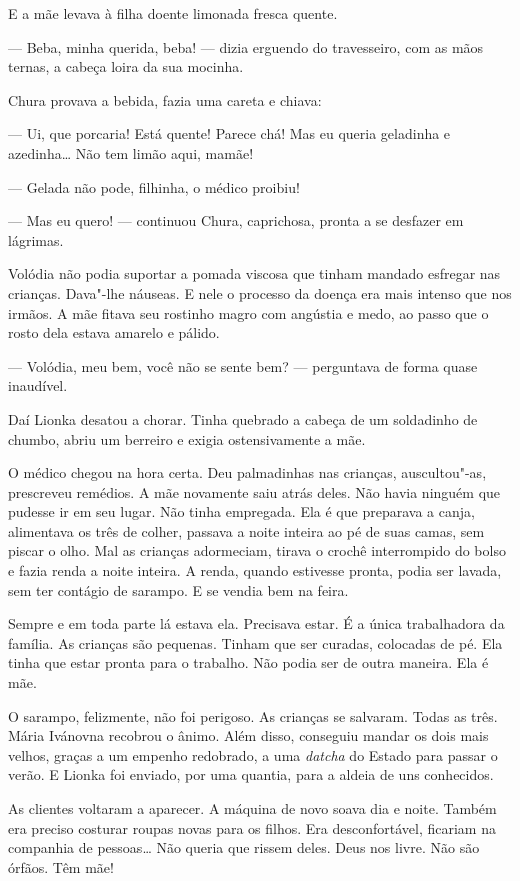 E a mãe levava à filha doente limonada fresca quente.

--- Beba, minha querida, beba! --- dizia erguendo do travesseiro, com as
mãos ternas, a cabeça loira da sua mocinha.

Chura provava a bebida, fazia uma careta e chiava:

--- Ui, que porcaria! Está quente! Parece chá! Mas eu queria geladinha e
azedinha\ldots{} Não tem limão aqui, mamãe!

--- Gelada não pode, filhinha, o médico proibiu!

--- Mas eu quero! --- continuou Chura, caprichosa, pronta a se desfazer
em lágrimas.

Volódia não podia suportar a pomada viscosa que tinham mandado esfregar
nas crianças. Dava"-lhe náuseas. E nele o processo da doença era mais
intenso que nos irmãos. A mãe fitava seu rostinho magro com angústia e medo, ao
passo que o rosto dela estava amarelo e pálido.

--- Volódia, meu bem, você não se sente bem? --- perguntava de forma
quase inaudível.

Daí Lionka desatou a chorar. Tinha quebrado a cabeça de um soldadinho de
chumbo, abriu um berreiro e exigia ostensivamente a mãe.

O médico chegou na hora certa. Deu palmadinhas nas crianças,
auscultou"-as, prescreveu remédios. A mãe novamente saiu atrás deles. Não
havia ninguém que pudesse ir em seu lugar. Não tinha empregada. Ela é
que preparava a canja, alimentava os três de colher, passava a noite
inteira ao pé de suas camas, sem piscar o olho. Mal as crianças
adormeciam, tirava o crochê interrompido do bolso e fazia renda a noite
inteira. A renda, quando estivesse pronta, podia ser lavada, sem ter
contágio de sarampo. E se vendia bem na feira.

Sempre e em toda parte lá estava ela. Precisava estar. É a única
trabalhadora da família. As crianças são pequenas. Tinham que ser
curadas, colocadas de pé. Ela tinha que estar pronta para o trabalho.
Não podia ser de outra maneira. Ela é mãe.

\asterisc

O sarampo, felizmente, não foi perigoso. As crianças se salvaram. Todas
as três. Mária Ivánovna recobrou o ânimo. Além disso, conseguiu mandar
os dois mais velhos, graças a um empenho redobrado, a uma
\emph{datcha} do Estado para passar o verão. E Lionka foi enviado, por
uma quantia, para a aldeia de uns conhecidos.

As clientes voltaram a aparecer. A máquina de novo soava dia e noite.
Também era preciso costurar roupas novas para os filhos. Era
desconfortável, ficariam na companhia de pessoas\ldots{} Não queria que
rissem deles. Deus nos livre. Não são órfãos. Têm mãe!

